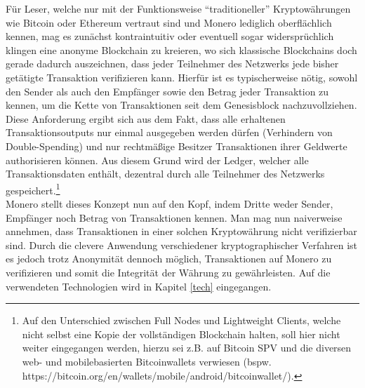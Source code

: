 Für Leser, welche nur mit der Funktionsweise ``traditioneller'' Kryptowährungen wie Bitcoin oder Ethereum vertraut sind und Monero lediglich oberflächlich kennen, 
mag es zunächst kontraintuitiv oder eventuell sogar widersprüchlich klingen eine anonyme Blockchain zu kreieren, wo sich klassische Blockchains doch gerade dadurch auszeichnen,
dass jeder Teilnehmer des Netzwerks jede bisher getätigte Transaktion verifizieren kann. Hierfür ist es typischerweise nötig, sowohl den Sender als auch den Empfänger sowie
den Betrag jeder Transaktion zu kennen, um die Kette von Transaktionen seit dem Genesisblock nachzuvollziehen. Diese Anforderung ergibt sich aus dem Fakt, dass alle erhaltenen Transaktionsoutputs nur einmal
ausgegeben werden dürfen (Verhindern von Double-Spending) und nur rechtmäßige Besitzer Transaktionen ihrer Geldwerte authorisieren können. Aus diesem Grund wird der Ledger, welcher alle Transaktionsdaten enthält,
dezentral durch alle Teilnehmer des Netzwerks gespeichert.\footnote{Auf den Unterschied zwischen Full Nodes und Lightweight Clients, welche nicht selbst eine Kopie der vollständigen
Blockchain halten, soll hier nicht weiter eingegangen werden, hierzu sei z.B. auf Bitcoin SPV und die diversen web- und mobilebasierten Bitcoinwallets verwiesen (bspw. https://bitcoin.org/en/wallets/mobile/android/bitcoinwallet/). }\\

Monero stellt dieses Konzept nun auf den Kopf, indem Dritte weder Sender, Empfänger noch Betrag von Transaktionen kennen. Man mag nun naiverweise annehmen, dass Transaktionen
in einer solchen Kryptowährung nicht verifizierbar sind. Durch die clevere Anwendung verschiedener kryptographischer Verfahren ist es jedoch trotz Anonymität dennoch möglich, Transaktionen
auf Monero zu verifizieren und somit die Integrität der Währung zu gewährleisten. Auf die verwendeten Technologien wird in Kapitel \ref{tech} eingegangen.

